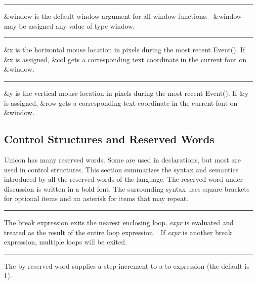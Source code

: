 \bigskip\hrule\vspace{0.1cm}

\noindent
\textsf{\&window} is the default window argument for all window
functions. \ \textsf{\&window} may be assigned any value of type
window.

\bigskip\hrule\vspace{0.1cm}

\noindent
\textsf{\&x} is the horizontal mouse location in pixels during the most
recent \textsf{Event()}. If \textsf{\&x} is assigned, \textsf{\&col}
gets a corresponding text coordinate in the current font on
\textsf{\&window}.

\bigskip\hrule\vspace{0.1cm}

\noindent
\textsf{\&y} is the vertical mouse location in pixels during the most
recent \textsf{Event()}. If \textsf{\&y} is assigned, \textsf{\&row}
gets a corresponding text coordinate in the current font on
\textsf{\&window}.

\subsection[Control Structures and Reserved Words]{Control Structures
and Reserved Words}
Unicon has many reserved words. Some are used in
declarations, but most are used in control
structures. This section summarizes the syntax and semantics introduced
by all the reserved words of the language. The reserved word under
discussion is written in a bold font. The surrounding syntax uses
square brackets for optional items and an asterisk for items that may
repeat.

\bigskip\hrule\vspace{0.1cm}

\noindent
The \textsf{break} expression exits the nearest
enclosing loop. \textit{expr} is evaluated and treated as the result of
the entire loop expression. \ If \textit{expr} is another
\textsf{break} expression, multiple loops will be exited.

\bigskip\hrule\vspace{0.1cm}

\noindent
{}The \textsf{by} reserved word supplies a step
increment to a \textsf{to}{}-expression (the default is 1).

